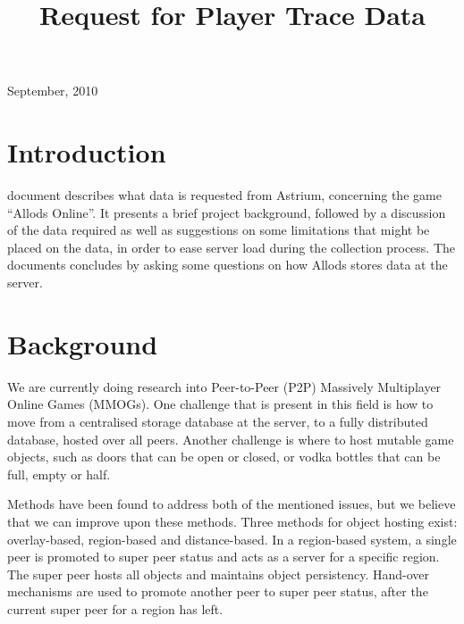 \documentclass[journal,oneside,a4paper,onecolumn]{IEEEtran}
\begin{document}
%
\title{Request for Player Trace Data}

\author{
}

\maketitle

\hfill September, 2010

\section{Introduction}


 document describes what data is requested from Astrium, concerning the game ``Allods Online''. It presents a brief project
background, followed by a discussion of the data required as well as suggestions on some limitations that might be placed on the data, in order to
ease server load during the collection process. The documents concludes by asking some questions on how Allods stores data at the server.

\section{Background}

We are currently doing research into Peer-to-Peer (P2P) Massively Multiplayer Online Games (MMOGs). One challenge that is present in this field is
how to move from a centralised storage database at the server, to a fully distributed database, hosted over all peers. Another challenge is where to
host mutable game objects, such as doors that can be open or closed, or vodka bottles that can be full, empty or half.

Methods have been found to address both of the mentioned issues, but we believe that we can improve upon these methods. Three methods for object
hosting exist: overlay-based, region-based and distance-based. In a region-based system, a single peer is promoted to super peer status and acts as a
server for a specific region. The super peer hosts all objects and maintains object persistency. Hand-over mechanisms are used to promote another
peer to super peer status, after the current super peer for a region has left.
\end{document}
